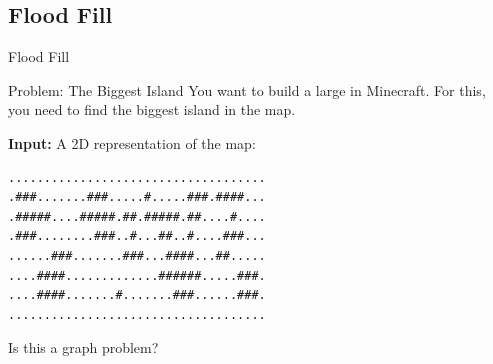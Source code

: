 \subsection{Flood Fill}

\begin{frame}[fragile]{Flood Fill}
  \begin{block}{Problem: The Biggest Island}
    You want to build a large in Minecraft. For this, you need to find the biggest island in the map.\bigskip

    {\bf Input:} A 2D representation of the map:
\begin{verbatim}
....................................
.###.......###.....#.....###.####...
.#####....#####.##.#####.##....#....
.###........###..#...##..#....###...
......###.......###...####...##.....
....####.............######.....###.
....####.......#.......###......###.
....................................
\end{verbatim}
  \end{block}
  \hfill Is this a graph problem?
\end{frame}

